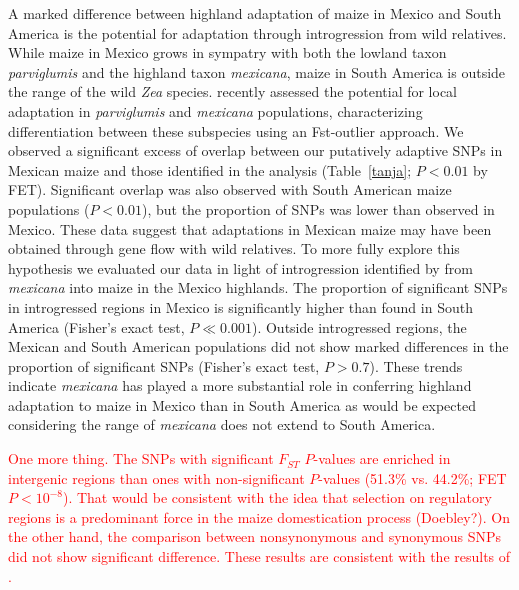 {{ A marked difference between highland adaptation of maize in Mexico and South America is the potential for adaptation through introgression from wild relatives.  While maize in Mexico grows in sympatry with both the lowland taxon \emph{parviglumis} and the highland taxon \emph{mexicana}, maize in South America is outside the range of the wild \emph{Zea} species.
 \cite{Pyhajarvi2013} recently assessed the potential for local adaptation in \emph{parviglumis} and \emph{mexicana} populations, characterizing differentiation between these subspecies using an Fst-outlier approach.
We observed a significant excess of overlap between our putatively adaptive SNPs in Mexican maize and those identified in the \cite{Pyhajarvi2013} analysis (Table~\ref{tanja}; $P<0.01$ by FET).
Significant overlap was also observed with South American maize populations ($P<0.01$), but the proportion of SNPs was lower than observed in Mexico.  These data suggest that adaptations in Mexican maize may have been obtained through gene flow with wild relatives.  To more fully explore this hypothesis we evaluated our data in light of introgression identified by \cite{Profford_2013} from \emph{mexicana} into maize in the Mexico highlands.  
The proportion of significant SNPs in introgressed regions in Mexico is significantly higher than found in South America (Fisher's exact test, $P\ll0.001$).
Outside introgressed regions, the Mexican and South American populations did not show marked differences in the proportion of significant SNPs (Fisher's exact test, $P>0.7$). %
These trends indicate \emph{mexicana} has played a more substantial role in conferring highland adaptation to maize in Mexico than in South America as would be expected considering the range of \emph{mexicana} does not extend to South America.

\textcolor{red}{One more thing.  The SNPs with significant $F_{ST}$ $P$-values are enriched in intergenic regions than ones with non-significant $P$-values (51.3\% vs. 44.2\%; FET $P < 10^{-8}$).  That would be consistent with the idea that selection on regulatory regions is a predominant force in the maize domestication process (Doebley?). On the other hand, the comparison between nonsynonymous and synonymous SNPs did not show significant difference.  These results are consistent with the results of \cite{Pyhajarvi2013}.}

}}
